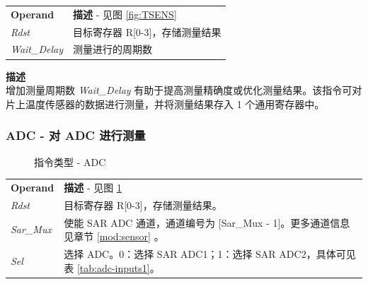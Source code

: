 \documentclass[main\_\_CN.tex]{subfiles}
\begin{document}
\vspace{-2em}
\begin{tabular}{ l l }
\textbf{Operand} & \textbf{描述} - 见图 \ref{fig:TSENS} \\
\textit{Rdst} & 目标寄存器 R[0-3]，存储测量结果 \\
\textit{Wait\_Delay} & 测量进行的周期数
\end{tabular}

\textbf{描述} \\
增加测量周期数 \textit{Wait\_Delay} 有助于提高测量精确度或优化测量结果。该指令可对片上温度传感器的数据进行测量，并将测量结果存入 1 个通用寄存器中。


\subsubsection{ADC - 对 ADC 进行测量} \label{sec:ADC}

%
%
%
%
%
\begin{figure}[H]
    \centering
    \caption{指令类型 - ADC}
    \label{fig:ADC}
\end{figure}

\vspace{-2em}
\begin{tabular}{ l p{11.0cm} }
\textbf{Operand} & \textbf{描述} - 见图 \ref{fig:ADC} \\
\textit{Rdst} & 目标寄存器 R[0-3]，存储测量结果。\\
\textit{Sar\_Mux} & 使能 SAR ADC 通道，通道编号为 [Sar\_Mux - 1]。更多通道信息见章节 \ref{mod:sensor} \textit{\nameref{mod:sensor}}。 \\
\textit{Sel} & 选择 ADC。0：选择 SAR ADC1；1：选择 SAR ADC2，具体可见表 \ref{tab:adc-inputs1}。
\end{tabular}
\end{document}
